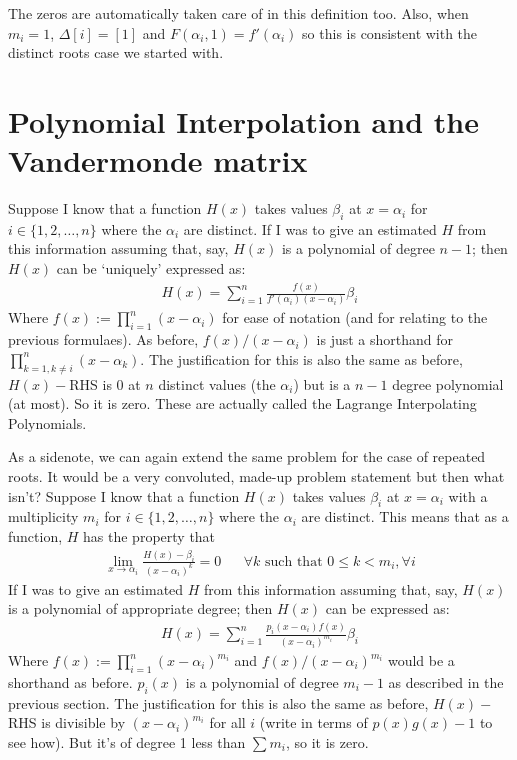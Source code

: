 \documentclass{article}
\begin{document}
The zeros are automatically taken care of in this definition too. Also, when $m_i = 1$, $\Delta[i] = [1]$ and $F(\alpha_i, 1) = f'(\alpha_i)$ so this is consistent with the distinct roots case we started with.

\section*{Polynomial Interpolation and the Vandermonde matrix}
Suppose I know that a function $H(x)$ takes values $\beta_i$ at $x = \alpha_i$ for $i \in \{1,2,\dots,n\}$ where the $\alpha_i$ are distinct. If I was to give an estimated $H$ from this information assuming that, say, $H(x)$ is a polynomial of degree $n-1$; then $H(x)$ can be `uniquely' expressed as:
\begin{align}
    H(x) = \sum_{i=1}^{n} \frac{f(x)}{f'(\alpha_i)(x-\alpha_i)} \beta_i \label{defn-H}
\end{align}
Where $f(x) := \prod_{i=1}^{n} (x-\alpha_i)$ for ease of notation (and for relating to the previous formulaes). As before, $f(x)/(x-\alpha_i)$ is just a shorthand for $\prod_{k=1, k\neq i}^{n} (x-\alpha_k)$. The justification for this is also the same as before, $H(x)-$RHS is $0$ at $n$ distinct values (the $\alpha_i$) but is a $n-1$ degree polynomial (at most). So it is zero. These are actually called the Lagrange Interpolating Polynomials.
\begin{tcolorbox}
As a sidenote, we can again extend the same problem for the case of repeated roots. It would be a very convoluted, made-up problem statement but then what isn't? Suppose I know that a function $H(x)$ takes values $\beta_i$ at $x = \alpha_i$ with a multiplicity $m_i$ for $i \in \{1,2,\dots,n\}$ where the $\alpha_i$ are distinct. This means that as a function, $H$ has the property that
\begin{align}
    \lim_{x \rightarrow \alpha_i} \frac{H(x) - \beta_i}{(x-\alpha_i)^{k}} = 0 &&\forall k \textrm{ such that } 0\leq k<m_i, \forall i
\end{align}
If I was to give an estimated $H$ from this information assuming that, say, $H(x)$ is a polynomial of appropriate degree; then $H(x)$ can be expressed as:
\begin{align}
    H(x) = \sum_{i=1}^{n} \frac{p_i(x-\alpha_i) f(x)}{(x-\alpha_i)^{m_i}} \beta_i
\end{align}
Where $f(x) := \prod_{i=1}^{n} (x-\alpha_i)^{m_i}$ and $f(x)/(x-\alpha_i)^{m_i}$ would be a shorthand as before. $p_i(x)$ is a polynomial of degree $m_i-1$ as described in the previous section. The justification for this is also the same as before, $H(x)-$RHS is divisible by $(x-\alpha_i)^{m_i}$ for all $i$ (write in terms of $p(x)g(x)-1$ to see how). But it's of degree 1 less than $\sum m_i$, so it is zero.
\end{tcolorbox}
\end{document}
